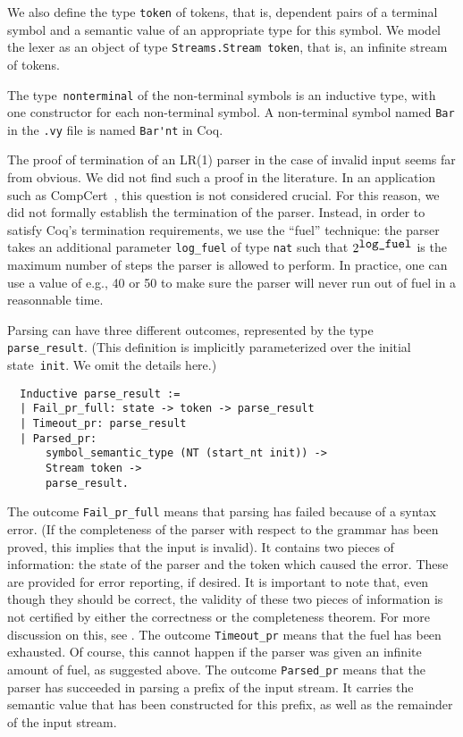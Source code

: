 \documentclass[onecolumn,11pt,nocopyrightspace,preprint]{sigplanconf}
\begin{document}
We also define the type \verb+token+ of tokens, that is, dependent pairs of a
terminal symbol and a semantic value of an appropriate type for this symbol.
We model the lexer as an object of type \verb+Streams.Stream token+, that is,
an infinite stream of tokens.

The type~\verb+nonterminal+ of the non-terminal symbols is an inductive type,
with one constructor for each non-terminal symbol. A non-terminal symbol named
\verb+Bar+ in the \verb+.vy+ file is named \verb+Bar'nt+ in Coq.

The proof of termination of an LR(1) parser in the case of invalid input seems
far from obvious. We did not find such a proof in the literature. In an
application such as CompCert~\cite{compcert}, this question is not considered
crucial. For this reason, we did not formally establish the termination of the
parser. Instead, in order to satisfy Coq's termination requirements, we use
the ``fuel'' technique: the parser takes an additional parameter
\verb+log_fuel+ of type \verb+nat+ such that $2^{\verb+log_fuel+}$ is the
maximum number of steps the parser is allowed to perform. In practice, one
can use a value of e.g., 40 or 50 to make sure the parser will never run out
of fuel in a reasonnable time.

Parsing can have three different outcomes, represented by the type
\verb+parse_result+.
%
(This definition is implicitly parameterized over the initial
state~\verb+init+. We omit the details here.)
%
\begin{verbatim}
  Inductive parse_result :=
  | Fail_pr_full: state -> token -> parse_result
  | Timeout_pr: parse_result
  | Parsed_pr:
      symbol_semantic_type (NT (start_nt init)) ->
      Stream token ->
      parse_result.
\end{verbatim}

The outcome \verb+Fail_pr_full+ means that parsing has failed because of a syntax
error. (If the completeness of the parser with respect to the grammar has been
proved, this implies that the input is invalid). It contains two pieces of information:
the state of the parser and the token which caused the error. These are provided for
error reporting, if desired. It is important to note that, even though they should be correct,
the validity of these two pieces of information is not certified by either the correctness
or the completeness theorem. For more discussion on this, see .
The outcome \verb+Timeout_pr+ means that the fuel has been exhausted.
Of course, this cannot happen if the parser was given an infinite amount of fuel,
as suggested above. The outcome \verb+Parsed_pr+ means that the parser has
succeeded in parsing a prefix of the input stream. It carries the semantic value
that has been constructed for this prefix, as well as the remainder of the input stream.
\end{document}
